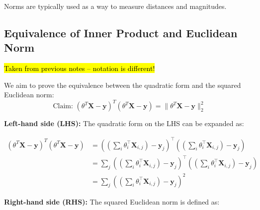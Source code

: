 Norms are typically used as a way to measure distances and magnitudes.


\subsection{Equivalence of Inner Product and Euclidean Norm}

\hl{Taken from previous notes – notation is different!}

We aim to prove the equivalence between the quadratic form and the squared Euclidean norm:
\begin{equation}
    \text{Claim: }(\theta^T \mathbf{X} - \mathbf{y})^T (\theta^T \mathbf{X} - \mathbf{y}) = \| \theta^T \mathbf{X} - \mathbf{y} \|_2^2
\end{equation}

\textbf{Left-hand side (LHS):} The quadratic form on the LHS can be expanded as:

\begin{align}
    (\theta^T \mathbf{X} - \mathbf{y})^T (\theta^T \mathbf{X} - \mathbf{y}) & = \left( \left( \sum_i \theta_i^\top \mathbf{X}_{i,j} \right) - \mathbf{y}_j \right)^\top \left( \left( \sum_i \theta_i^\top \mathbf{X}_{i,j} \right) - \mathbf{y}_j \right)         \\
                                                                            & = \sum_j \left( \left( \sum_i \theta_i^\top \mathbf{X}_{i,j} \right) - \mathbf{y}_j \right) ^\top \left( \left( \sum_i \theta_i^\top \mathbf{X}_{i,j} \right) - \mathbf{y}_j \right) \\
                                                                            & = \sum_j \left( \left( \sum_i \theta_i^\top \mathbf{X}_{i,j} \right) - \mathbf{y}_j \right)^2
\end{align}

\bigskip

\textbf{Right-hand side (RHS):} The squared Euclidean norm is defined as:

